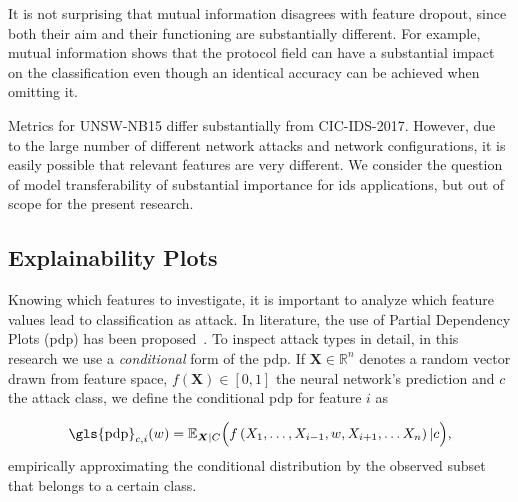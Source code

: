 \documentclass[conference]{IEEEtran}
\begin{document}
It is not surprising that mutual information disagrees with feature dropout, since both their aim and their functioning are substantially different. For example, mutual information shows that the protocol field can have a substantial impact on the classification even though an identical accuracy can be achieved when omitting it.


Metrics for UNSW-NB15 differ substantially from CIC-IDS-2017. However, due to the large number of different network attacks and network configurations, it is easily possible that relevant features are very different. We consider the question of model transferability of substantial importance for \gls{ids} applications, but out of scope for the present research.

\subsection{Explainability Plots}
Knowing which features to investigate, it is important to analyze which feature values lead to classification as attack.
In literature, the use of Partial Dependency Plots (\gls{pdp}) has been proposed~\cite{friedman_greedy_2001}. To inspect attack types in detail, in this research we use a \textit{conditional} form of the \gls{pdp}. If $\boldsymbol X \in \mathbb R ^n$ denotes a random vector drawn from feature space, $f(\boldsymbol X) \in [0,1]$ the neural network's prediction and $c$ the attack class, we define the conditional \gls{pdp} for feature $i$  as

\begin{equation} \label{eq:pdp_conditional}
\text{\gls{pdp}}_{c,i}(w) = \mathbb E_{\boldsymbol X | C} \Big(f \left( X_1,\ldots,X_{i-1},w,X_{i+1},\ldots X_n \right) | c\Big),
\end{equation}
empirically approximating the conditional distribution by the observed subset that belongs to a certain class.
\end{document}
